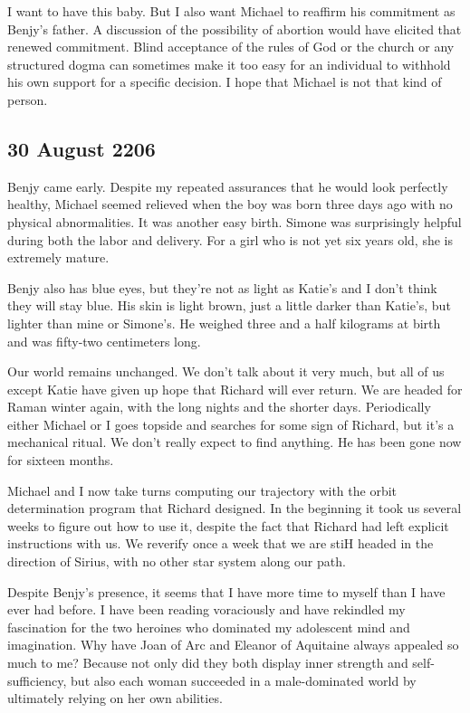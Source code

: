 \documentclass[]{article}
\begin{document}
I want to have this baby. But I also want Michael to reaffirm his commitment as Benjy’s father. A discussion of the possibility of abortion would have elicited that renewed commitment. Blind acceptance of the rules of God or the church or any structured dogma can sometimes make it too easy for an individual to withhold his own support for a specific decision. I hope that Michael is not that kind of person.

\subsection{30 August 2206}

Benjy came early. Despite my repeated assurances that he would look perfectly healthy, Michael seemed relieved when the boy was born three days ago with no physical abnormalities. It was another easy birth. Simone was surprisingly helpful during both the labor and delivery. For a girl who is not yet six years old, she is extremely mature.

Benjy also has blue eyes, but they’re not as light as Katie’s and I don’t think they will stay blue. His skin is light brown, just a little darker than Katie’s, but lighter than mine or Simone’s. He weighed three and a half kilograms at birth and was fifty-two centimeters long.

Our world remains unchanged. We don’t talk about it very much, but all of us except Katie have given up hope that Richard will ever return. We are headed for Raman winter again, with the long nights and the shorter days. Periodically either Michael or I goes topside and searches for some sign of Richard, but it’s a mechanical ritual. We don’t really expect to find anything. He has been gone now for sixteen months.

Michael and I now take turns computing our trajectory with the orbit determination program that Richard designed. In the beginning it took us several weeks to figure out how to use it, despite the fact that Richard had left explicit instructions with us. We reverify once a week that we are stiH headed in the direction of Sirius, with no other star system along our path.

Despite Benjy’s presence, it seems that I have more time to myself than I have ever had before. I have been reading voraciously and have rekindled my fascination for the two heroines who dominated my adolescent mind and imagination. Why have Joan of Arc and Eleanor of Aquitaine always appealed so much to me? Because not only did they both display inner strength and self-sufficiency, but also each woman succeeded in a male-dominated world by ultimately relying on her own abilities.
\end{document}
